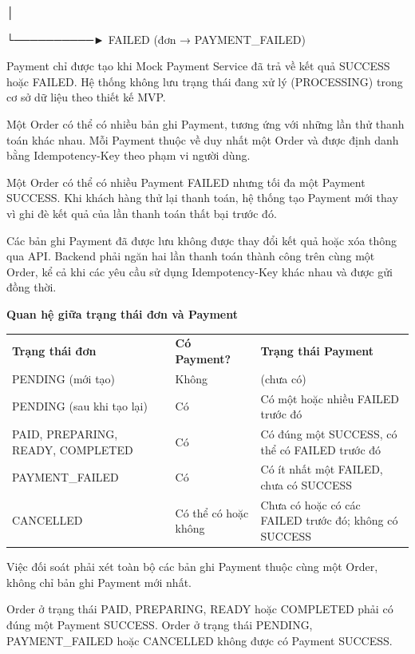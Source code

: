 \documentclass[11pt,a4paper,oneside]{report}
\begin{document}
│

└──────────► FAILED (đơn → PAYMENT\_FAILED)

Payment chỉ được tạo khi Mock Payment Service đã trả về kết quả SUCCESS hoặc FAILED. Hệ thống không lưu trạng thái đang xử lý (PROCESSING) trong cơ sở dữ liệu theo thiết kế MVP.

Một Order có thể có nhiều bản ghi Payment, tương ứng với những lần thử thanh toán khác nhau. Mỗi Payment thuộc về duy nhất một Order và được định danh bằng Idempotency-Key theo phạm vi người dùng.

Một Order có thể có nhiều Payment FAILED nhưng tối đa một Payment SUCCESS. Khi khách hàng thử lại thanh toán, hệ thống tạo Payment mới thay vì ghi đè kết quả của lần thanh toán thất bại trước đó.

Các bản ghi Payment đã được lưu không được thay đổi kết quả hoặc xóa thông qua API. Backend phải ngăn hai lần thanh toán thành công trên cùng một Order, kể cả khi các yêu cầu sử dụng Idempotency-Key khác nhau và được gửi đồng thời.

\textbf{Quan hệ giữa trạng thái đơn và Payment}

\begin{longtable}[]{@{}
  >{\raggedright\arraybackslash}p{}
  >{\raggedright\arraybackslash}p{}
  >{\raggedright\arraybackslash}p{}@{}}
\toprule\noalign{}
\endhead
\bottomrule\noalign{}
\endlastfoot
\textbf{Trạng thái đơn} & \textbf{Có Payment?} & \textbf{Trạng thái Payment} \\
PENDING (mới tạo) & Không & (chưa có) \\
PENDING (sau khi tạo lại) & Có & Có một hoặc nhiều FAILED trước đó \\
PAID, PREPARING, READY, COMPLETED & Có & Có đúng một SUCCESS, có thể có FAILED trước đó \\
PAYMENT\_FAILED & Có & Có ít nhất một FAILED, chưa có SUCCESS \\
CANCELLED & Có thể có hoặc không & Chưa có hoặc có các FAILED trước đó; không có SUCCESS \\
\end{longtable}

Việc đối soát phải xét toàn bộ các bản ghi Payment thuộc cùng một Order, không chỉ bản ghi Payment mới nhất.

Order ở trạng thái PAID, PREPARING, READY hoặc COMPLETED phải có đúng một Payment SUCCESS. Order ở trạng thái PENDING, PAYMENT\_FAILED hoặc CANCELLED không được có Payment SUCCESS.
\end{document}
